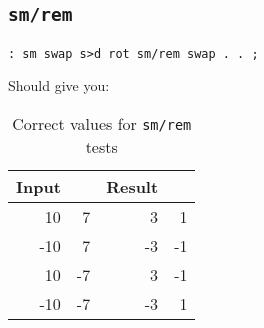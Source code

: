 \subsection{\texttt{sm/rem}}

\begin{lstlisting}[frame=lines]
        : sm swap s>d rot sm/rem swap . . ; 
\end{lstlisting}

\noindent Should give you: 

\begin{table}[h!]
\centering
\begin{tabular}{ | r r || r r | }
        \hline
	Input & & Result & \\
        \hline
         10 &  7 &  3 &  1\\
        -10 &  7 & -3 & -1 \\
         10 & -7 &  3 & -1\\
        -10 & -7 & -3 &  1\\
        \hline
\end{tabular}
        \caption{Correct values for \texttt{sm/rem} tests}
        \label{table_smrem}
\end{table}


